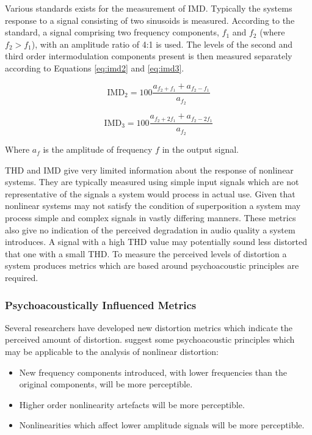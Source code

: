 			Various standards exists for the measurement of IMD. Typically the systems response to a signal
			consisting of two sinusoids is measured. According to the \citet{IEC2001amplifiers} standard, a
			signal comprising two frequency components, $f_{1}$ and $f_{2}$ (where $f_{2} > f_{1}$), with an
			amplitude ratio of 4:1 is used.  The levels of the second and third order intermodulation components
			present is then measured separately according to Equations \ref{eq:imd2} and \ref{eq:imd3}.

			\begin{equation}
				\mathrm{IMD}_{2} = 100\frac{a_{f_{2} + f_{1}} + a_{f_{2} - f_{1}}}{a_{f_{2}}}
				\label{eq:imd2}
			\end{equation}

			\begin{equation}
				\mathrm{IMD}_{3} = 100\frac{a_{f_{2} + 2f_{1}} + a_{f_{2} - 2f_{1}}}{a_{f_{2}}}
				\label{eq:imd3}
			\end{equation}

			Where $a_{f}$ is the amplitude of frequency $f$ in the output signal.

			THD and IMD give very limited information about the response of nonlinear systems. They are
			typically measured using simple input signals which are not representative of the signals a system
			would process in actual use. Given that nonlinear systems may not satisfy the condition of
			superposition a system may process simple and complex signals in vastly differing manners. These
			metrics also give no indication of the perceived degradation in audio quality a system introduces. A
			signal with a high THD value may potentially sound less distorted that one with a small THD. To
			measure the perceived levels of distortion a system produces metrics which are based around
			psychoacoustic principles are required.

		\subsubsection*{Psychoacoustically Influenced Metrics}
			Several researchers have developed new distortion metrics which indicate the perceived amount of
			distortion. \citet{geddes2003auditory} suggest some psychoacoustic principles which may be
			applicable to the analysis of nonlinear distortion:

			\begin{itemize}
				\item New frequency components introduced, with lower frequencies than the original
					components, will be more perceptible.
				\item Higher order nonlinearity artefacts will be more perceptible.
				\item Nonlinearities which affect lower amplitude signals will be more perceptible.
			\end{itemize}

